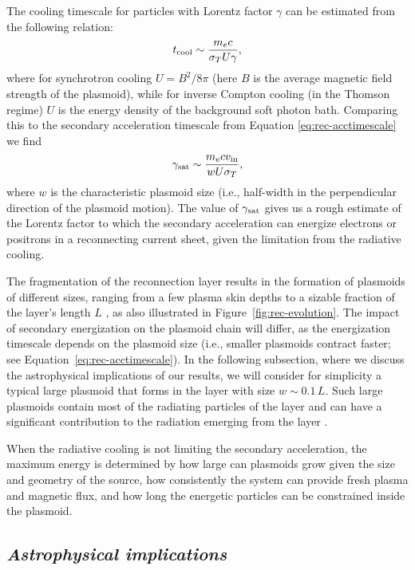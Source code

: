 The cooling timescale for particles with Lorentz factor $\gamma$ can be estimated from the following relation:
\begin{equation}
    t_{\rm cool} \sim \frac{m_e c}{\sigma_T U \gamma},
\end{equation}
where for synchrotron cooling $U=B^2/8\pi$ (here $B$ is the average magnetic field strength of the plasmoid), while for inverse Compton cooling (in the Thomson regime) $U$ is the energy density of the background soft photon bath. Comparing this to the secondary acceleration timescale from Equation \eqref{eq:rec-acctimescale} we find
\begin{equation}
    \label{eq:rec-gammacrit}
    \gamma_{\rm sat} \sim \frac{m_e c v_{\rm in}}{w U \sigma_T},
\end{equation}
where $w$ is the characteristic plasmoid size (i.e., half-width in the perpendicular direction of the plasmoid motion). The value of $\gamma_{\rm sat}$ gives us a rough estimate of the Lorentz factor to which the secondary acceleration can energize electrons or positrons in a reconnecting current sheet, given the limitation from the radiative cooling. 

The fragmentation  of the reconnection layer results in the formation of plasmoids of different sizes, ranging from a few plasma skin depths to a sizable fraction of the layer's length $L$ \citep[e.g.,][]{2007PhPl...14j0703L, 2010PhRvL.105w5002U, 2016MNRAS.462...48S}, as also illustrated in Figure~\ref{fig:rec-evolution}. The impact of secondary energization on the plasmoid chain will differ, as the energization timescale depends on the plasmoid size (i.e., smaller plasmoids contract faster; see Equation~\ref{eq:rec-acctimescale}). In the following subsection, where we discuss the astrophysical implications of our results, we will consider for simplicity a typical large plasmoid that forms in the layer with size $w\sim 0.1 \, L$. Such large plasmoids contain most of the radiating particles of the layer and can have a significant contribution to the radiation emerging from the layer \citep[see, e.g.,][]{2016MNRAS.462.3325P,2018MNRAS.475.3797P}.

When the radiative cooling is not limiting the secondary acceleration, the maximum energy is determined by how large can plasmoids grow given the size and geometry of the source, how consistently the system can provide fresh plasma and magnetic flux, and how long the energetic particles can be constrained inside the plasmoid.

\subsection*{\small\it Astrophysical implications} 

